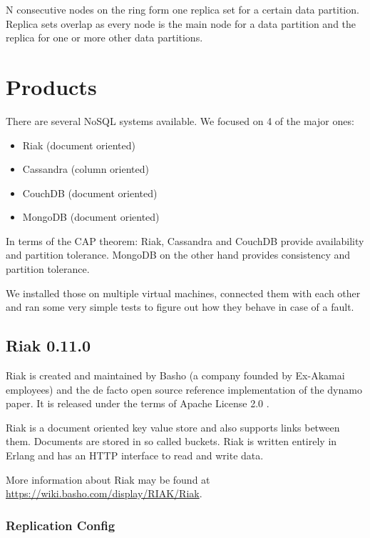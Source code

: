 N consecutive nodes on the ring form one replica set for a certain
data partition. Replica sets overlap as every node is the main node
for a data partition and the replica for one or more other data partitions.

\section{Products}

There are several NoSQL systems available. We focused on 4 of the
major ones:

\begin{itemize}
\item
  Riak (document oriented)
\item
  Cassandra (column oriented)
\item
  CouchDB (document oriented)
\item
  MongoDB (document oriented)
\end{itemize}
In terms of the CAP theorem: Riak, Cassandra and CouchDB provide
availability and partition tolerance. MongoDB on the other hand
provides consistency and partition tolerance.

We installed those on multiple virtual machines, connected them
with each other and ran some very simple tests to figure out how
they behave in case of a fault.

\subsection{Riak 0.11.0}

Riak is created and maintained by Basho (a company founded by
Ex-Akamai employees) and the de facto open source reference
implementation of the dynamo paper. It is released under the terms
of Apache License 2.0 .

Riak is a document oriented key value store and also supports links
between them. Documents are stored in so called buckets. Riak is
written entirely in Erlang and has an HTTP interface to read and
write data.

More information about Riak may be found at
\url{https://wiki.basho.com/display/RIAK/Riak}.

\subsubsection{Replication Config}

